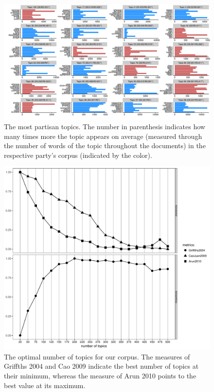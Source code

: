 \documentclass[11pt]{article}
\begin{document}
\begin{figure}[!ht]
	\centering %
	\caption{The most partisan topics. The number in parenthesis indicates how many times more the topic appears on average (measured through the number of words of the topic throughout the documents) in the respective party's corpus (indicated by the color).}
	\label{partisan_topics}
	\includegraphics[height=0.75\textheight]{figures/partisanTopics.pdf}
\end{figure}

\begin{figure}[!ht]
	\centering %
	\caption{The optimal number of topics for our corpus. The measures of Griffths 2004 and Cao 2009 indicate the best number of topics at their minimum, whereas the measure of Arun 2010 points to the best value at its maximum.}
	\label{ldatuning}
	\includegraphics[height=0.75\textheight]{figures/topicnumber_ldatuning.pdf}
\end{figure}
\end{document}
